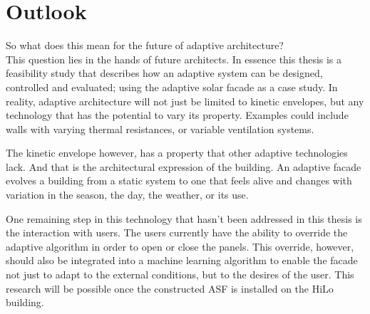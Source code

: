 \section{Outlook}
\label{ch:mainoutlook}

So what does this mean for the future of adaptive architecture? \\

This question lies in the hands of future architects. In essence this thesis is a feasibility study that describes how an adaptive system can be designed, controlled and evaluated; using the adaptive solar facade as a case study. In reality, adaptive architecture will not just be limited to kinetic envelopes, but any technology that has the potential to vary its property. Examples could include walls with varying thermal resistances, or variable ventilation systems. 

The kinetic envelope however, has a property that other adaptive technologies lack. And that is the architectural expression of the building. An adaptive facade evolves a building from a static system to one that feels alive and changes with variation in the season, the day, the weather, or its use. 

One remaining step in this technology that hasn't been addressed in this thesis is the interaction with users. The users currently have the ability to override the adaptive algorithm in order to open or close the panels. This override, however, should also be integrated into a machine learning algorithm to enable the facade not just to adapt to the external conditions, but to the desires of the user. This research will be possible once the constructed ASF is installed on the HiLo building.





